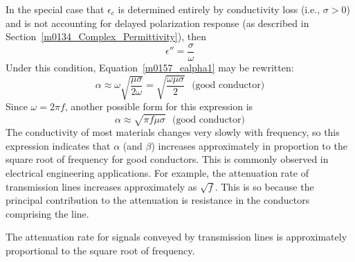 In the special case that $\epsilon_c$ is determined entirely by conductivity loss (i.e., $\sigma>0$) and is not accounting for delayed polarization response (as described in Section~\ref{m0134_Complex_Permittivity}), then
%
\begin{equation}
\epsilon'' = \frac{\sigma}{\omega}
\end{equation}
%
Under this condition, Equation~\ref{m0157_ealpha1} may be rewritten:
%
\begin{equation}
\alpha \approx \omega\sqrt{\frac{\mu\sigma}{2\omega}} = \sqrt{\frac{\omega\mu\sigma}{2}}  ~~~\mbox{(good conductor)}
\end{equation}
%
Since $\omega = 2\pi f$, another possible form for this expression is
%
\begin{equation}
\boxed{
\alpha \approx \sqrt{\pi f\mu\sigma}  ~~~\mbox{(good conductor)}
}
\end{equation}
%
The conductivity of most materials changes very slowly with frequency, so this expression indicates that $\alpha$ (and $\beta$) increases approximately in proportion to the square root of frequency for good conductors.
This is commonly observed in electrical engineering applications.
For example, the attenuation rate 
of transmission lines increases approximately as $\sqrt{f}$.  
This is so because the principal contribution to the attenuation is resistance in the conductors comprising the line.
%
\begin{mdframed}[backgroundcolor=yellow!20,nobreak=true] 
The attenuation rate for signals conveyed by transmission lines is approximately proportional to the square root of frequency.
\end{mdframed}

